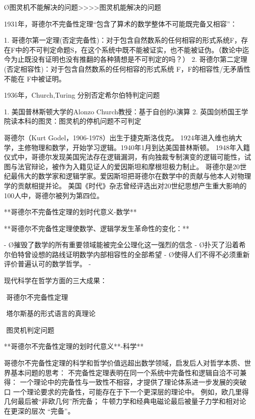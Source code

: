 Ø图灵机不能解决的问题>>>>图灵机能解决的问题





1931年，哥德尔不完备性定理“包含了算术的数学整体不可能既完备又相容”：

1. 哥德尔第一定理(否定完备性)：对于包含自然数系的任何相容的形式系统F，存在F中的不可判定命题S，在这个系统中既不能被证实，也不能被证伪。（数论中迄今为止既没有证明也没有推翻的各种猜想是不可判定的吗？）
2. 哥德尔第二定理(否定相容性)：对于包含自然数系的任何相容的形式系统 F，F的相容性/无矛盾性不能在 F中被证明。

1936年，Church,Turing 分别否定希尔伯特判定问题

1. 美国普林斯顿大学的Alonzo Church教授：基于自创的λ演算
2. 英国剑桥国王学院读本科的图灵：图灵机的停机问题不可判定



哥德尔（Kurt Godel，1906-1978）出生于捷克斯洛伐克。
1924年进入维也纳大学，主修物理和数学，开始学习逻辑。1940年1月到达美国普林斯顿。
1948年入籍仪式中，哥德尔发现美国宪法存在逻辑漏洞，有向独裁专制演变的逻辑可能性，试图与法官辩论，被作为入籍见证人的爱因斯坦和摩根坦极力制止。
哥德尔是20世纪最伟大的数学家和逻辑学家。爱因斯坦把哥德尔在数学中的贡献与他本人对物理学的贡献相提并论。
美国《时代》杂志曾经评选出对20世纪思想产生重大影响的100人中，哥德尔被列为第四位。



**哥德尔不完备性定理的划时代意义-数学**

**哥德尔不完备性定理使数学、逻辑学发生革命性的变化：**

- Ø摧毁了数学的所有重要领域能被完全公理化这一强烈的信念
- Ø扑灭了沿着希尔伯特曾设想的路线证明数学内部相容性的全部希望
- Ø使得人们不得不必须重新评价普遍认可的数学哲学。
- 

现代科学在哲学方面的三大成果：

​    哥德尔不完备性定理

​	塔尔斯基的形式语言的真理论

​	图灵机判定问题



**哥德尔不完备性定理的划时代意义**-科学**

哥德尔不完备性定理的科学和哲学价值远超出数学领域，启发后人对哲学本质、世界基本问题的思考：
不完备性定理表明在同一个系统中完备性和逻辑自洽不可兼得：
一个理论中的完备性与一致性不相容，才提供了理论体系进一步发展的突破口
一个理论要求的完备性，可能存在于下一个更深层的理论中。
例如，欧几里得几何最后被“非欧几何”所完备；
           牛顿力学和经典电磁论最后被量子力学和相对论在更深的层次 “完备”。

